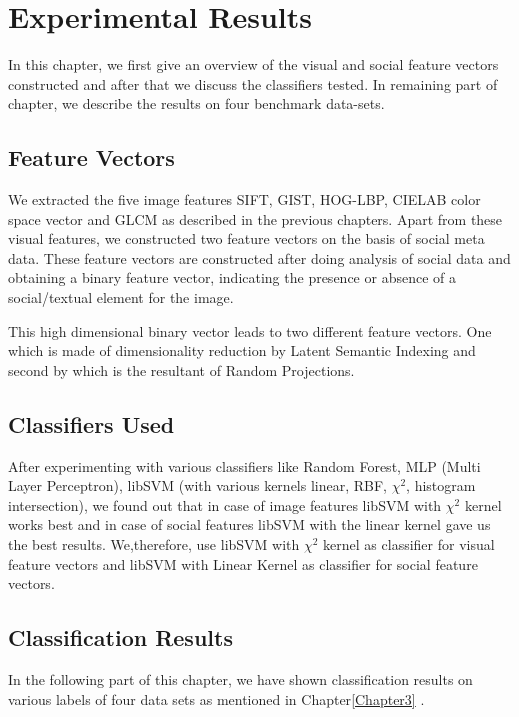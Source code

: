 
\chapter{Experimental Results} %


In this chapter, we first give an overview of the visual and social feature vectors constructed and after that we discuss the classifiers tested. In remaining part of chapter, we describe the results on four benchmark data-sets.

\section{Feature Vectors}
We extracted the five image features SIFT, GIST, HOG-LBP, CIELAB color space vector and GLCM as described in the previous chapters. Apart from these visual features, we constructed two feature vectors on the basis of social meta data. These feature vectors are constructed after doing analysis of social data and obtaining a binary feature vector, indicating the presence or absence of a social/textual element for the image.

This high dimensional binary vector leads to two different feature vectors. One which is made of dimensionality reduction by Latent Semantic Indexing and second by which is the resultant of Random Projections.

\section{Classifiers Used}
After experimenting with various classifiers like Random Forest, MLP (Multi Layer Perceptron), libSVM (with various kernels linear, RBF, $\chi^2$, histogram intersection), we found out that in case of image features libSVM with $\chi^2$ kernel works best and in case of social features libSVM with the linear kernel gave us the best results. We,therefore, use libSVM with $\chi^2$ kernel as classifier for visual feature vectors and libSVM with Linear Kernel as classifier for social feature vectors.

\section{Classification Results}
In the following part of this chapter, we have shown classification results on various labels of four data sets as mentioned in Chapter\ref{Chapter3} .


